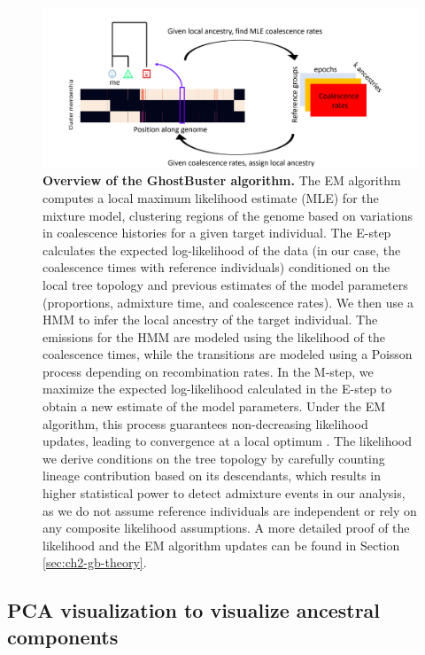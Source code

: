\begin{figure}[h!]
    \centering
    \includegraphics[scale=0.5]{figures/ghostbuster_method.PNG}
    \caption{\textbf{Overview of the GhostBuster algorithm.} The EM algorithm computes a local maximum likelihood estimate (MLE) for the mixture model, clustering regions of the genome based on variations in coalescence histories for a given target individual. The E-step calculates the expected log-likelihood of the data (in our case, the coalescence times with reference individuals) conditioned on the local tree topology and previous estimates of the model parameters (proportions, admixture time, and coalescence rates). We then use a HMM to infer the local ancestry of the target individual. The emissions for the HMM are modeled using the likelihood of the coalescence times, while the transitions are modeled using a Poisson process depending on recombination rates. In the M-step, we maximize the expected log-likelihood calculated in the E-step to obtain a new estimate of the model parameters. Under the EM algorithm, this process guarantees non-decreasing likelihood updates, leading to convergence at a local optimum \cite{dempster1977maximum}. The likelihood we derive conditions on the tree topology by carefully counting lineage contribution based on its descendants, which results in higher statistical power to detect admixture events in our analysis, as we do not assume reference individuals are independent or rely on any composite likelihood assumptions. A more detailed proof of the likelihood and the EM algorithm updates can be found in Section \ref{sec:ch2-gb-theory}.}
    \label{fig:gb_overview}
\end{figure}


\subsection{PCA visualization to visualize ancestral components}

